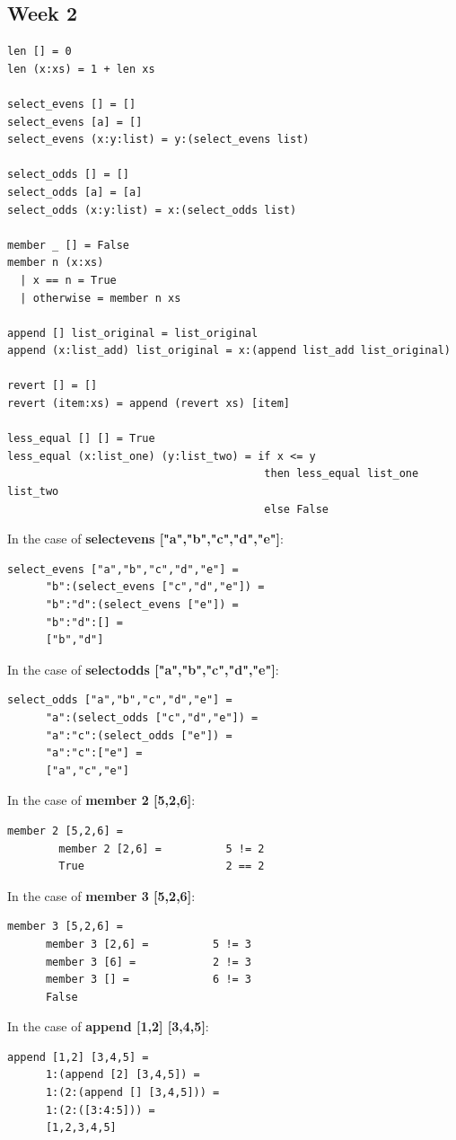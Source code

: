 \documentclass{article}
\theoremstyle{theorem}
\theoremstyle{definition}
\theoremstyle{remark}
\begin{document}
\subsection{Week 2}
\begin{lstlisting}
len [] = 0
len (x:xs) = 1 + len xs

select_evens [] = []
select_evens [a] = []
select_evens (x:y:list) = y:(select_evens list)

select_odds [] = []
select_odds [a] = [a]
select_odds (x:y:list) = x:(select_odds list)

member _ [] = False
member n (x:xs)
  | x == n = True
  | otherwise = member n xs

append [] list_original = list_original
append (x:list_add) list_original = x:(append list_add list_original)

revert [] = []
revert (item:xs) = append (revert xs) [item]

less_equal [] [] = True
less_equal (x:list_one) (y:list_two) = if x <= y
									    then less_equal list_one list_two
									    else False
\end{lstlisting}
In the case of \textbf{select\textunderscore evens ["a","b","c","d","e"]}:
\begin{lstlisting}
select_evens ["a","b","c","d","e"] =
      "b":(select_evens ["c","d","e"]) =
      "b":"d":(select_evens ["e"]) =
      "b":"d":[] =
      ["b","d"]
\end{lstlisting}
In the case of \textbf{select\textunderscore odds ["a","b","c","d","e"]}:
\begin{lstlisting}
select_odds ["a","b","c","d","e"] =
      "a":(select_odds ["c","d","e"]) =
      "a":"c":(select_odds ["e"]) =
      "a":"c":["e"] =
      ["a","c","e"]
\end{lstlisting}
In the case of \textbf{member 2 [5,2,6]}:
\begin{lstlisting}
member 2 [5,2,6] =
        member 2 [2,6] =          5 != 2
        True                      2 == 2
\end{lstlisting}
In the case of \textbf{member 3 [5,2,6]}:
\begin{lstlisting}
member 3 [5,2,6] =
      member 3 [2,6] =          5 != 3
      member 3 [6] =            2 != 3
      member 3 [] =             6 != 3
      False
\end{lstlisting}
In the case of \textbf{append [1,2] [3,4,5]}:
\begin{lstlisting}
append [1,2] [3,4,5] =
      1:(append [2] [3,4,5]) =
      1:(2:(append [] [3,4,5])) =
      1:(2:([3:4:5])) =
      [1,2,3,4,5]
\end{lstlisting}
\end{document}
